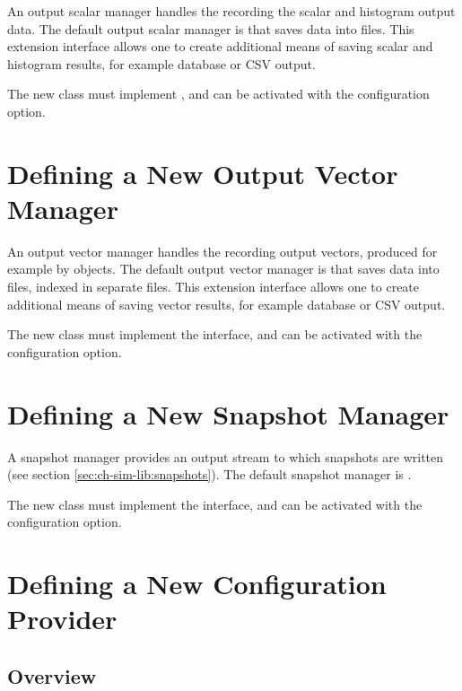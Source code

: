 An output scalar manager handles the recording the scalar and histogram
output data. The default output scalar manager is
 that saves data into  files.
This extension interface allows one to create additional means of saving
scalar and histogram results, for example database or CSV output.

The new class must implement , and can be
activated with the  configuration
option.


\section{Defining a New Output Vector Manager}
\label{sec:plugin-exts:outputvectormanager}

An output vector manager handles the recording output vectors, produced
for example by  objects. The default output vector
manager is  that saves data into
 files, indexed in separate  files. This extension
interface allows one to create additional means of saving vector results,
for example database or CSV output.

The new class must implement the  interface,
and can be activated with the 
configuration option.


\section{Defining a New Snapshot Manager}
\label{sec:plugin-exts:snapshotmanager}

A snapshot manager provides an output stream to which snapshots are written
(see section \ref{sec:ch-sim-lib:snapshots}). The default snapshot manager
is .

The new class must implement the  interface, and
can be activated with the  configuration
option.


\section{Defining a New Configuration Provider}
\label{sec:plugin-exts:configuration}

\subsection{Overview}

